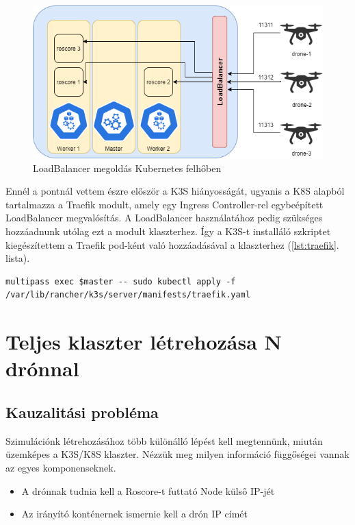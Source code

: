 \begin{figure}
	\centering
	\includegraphics[width=\linewidth]{figures/loadBalancer.png}
	\caption{LoadBalancer megoldás Kubernetes felhőben}
	\label{fig:loadbalancer}
\end{figure}

\noindent
Ennél a pontnál vettem észre először a K3S hiányosságát, ugyanis a K8S alapból tartalmazza a Traefik modult, amely egy Ingress Controller-rel egybeépített LoadBalancer megvalósítás. A LoadBalancer használatához pedig szükséges hozzáadnunk utólag ezt a modult klaszterhez. Így a K3S-t installáló szkriptet kiegészítettem a Traefik pod-ként való hozzáadásával a klaszterhez (\ref{lst:traefik}. lista).

\begin{lstlisting}[caption={Traefik hozzáadása a klaszterhez}, label={lst:traefik}]
multipass exec $master -- sudo kubectl apply -f /var/lib/rancher/k3s/server/manifests/traefik.yaml
\end{lstlisting}

\section{Teljes klaszter létrehozása N drónnal}

\subsection{Kauzalitási probléma}
Szimulációnk létrehozásához több különálló lépést kell megtennünk, miután üzemképes a K3S/K8S klaszter. Nézzük meg milyen információ függőségei vannak az egyes komponenseknek.
\begin{itemize}
	\item A drónnak tudnia kell a Roscore-t futtató Node külső IP-jét
	\item Az irányító konténernek ismernie kell a drón IP címét
\end{itemize}

